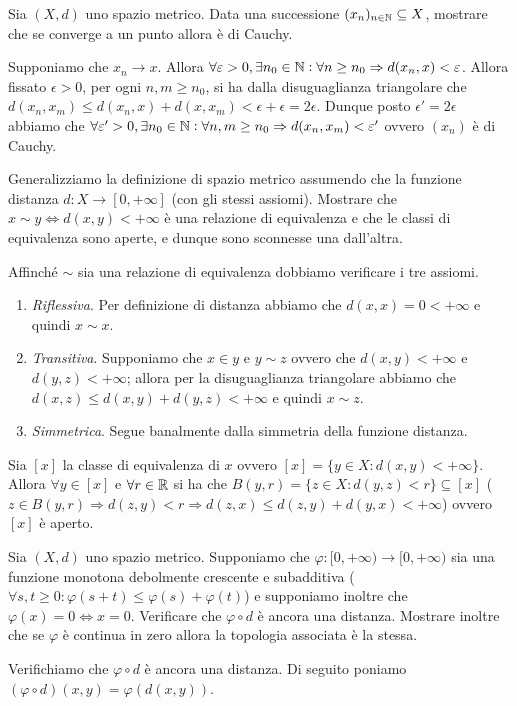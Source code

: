 \documentclass[a4paper]{article}\par \usepackage{style}\par
\begin{document}
\begin{es}
  Sia $ (X, d) $ uno spazio metrico. Data una successione $ (x_n)_{n \in \mathbb{N}} \subseteq X $, mostrare che se converge a un punto allora è di Cauchy.
\end{es}\par Supponiamo che $ x_n \to x $. Allora $ \forall \varepsilon > 0, \exists n_0 \in \mathbb{N} : \forall n \geq n_0 \Rightarrow d(x_n, x) < \varepsilon $. Allora fissato $ \epsilon > 0 $, per ogni $ n, m \geq n_0 $, si ha dalla disuguaglianza triangolare che $ d(x_n, x_m) \leq d(x_n, x) + d(x, x_m) < \epsilon + \epsilon = 2\epsilon $. Dunque posto $ \epsilon' = 2\epsilon $ abbiamo che $ \forall \varepsilon' > 0, \exists n_0 \in \mathbb{N} : \forall n, m \geq n_0 \Rightarrow d(x_n, x_m) < \varepsilon' $ ovvero $ (x_n) $ è di Cauchy.\par \begin{es}
  Generalizziamo la definizione di spazio metrico assumendo che la funzione distanza $ d \colon X \to [0, +\infty] $ (con gli stessi assiomi). Mostrare che $ x \sim y \iff d(x, y) < +\infty $ è una relazione di equivalenza e che le classi di equivalenza sono aperte, e dunque sono sconnesse una dall'altra.
\end{es}\par Affinché $ \sim $ sia una relazione di equivalenza dobbiamo verificare i tre assiomi.
\begin{enumerate}[label = (\roman*)]
\item \emph{Riflessiva}. Per definizione di distanza abbiamo che $ d(x, x) = 0 < +\infty $ e quindi $ x \sim x $.
\item \emph{Transitiva}. Supponiamo che $ x \in y $ e $ y \sim z $ ovvero che $ d(x, y) < +\infty $ e $ d(y, z) < +\infty $; allora per la disuguaglianza triangolare abbiamo che $ d(x, z) \leq d(x, y) + d(y, z) < +\infty $ e quindi $ x \sim z $.
\item \emph{Simmetrica}. Segue banalmente dalla simmetria della funzione distanza.
\end{enumerate}
Sia $ [x] $ la classe di equivalenza di $ x $ ovvero $ [x] = \{y \in X : d(x, y) < +\infty\} $. Allora $ \forall y \in [x] $ e $ \forall r \in \mathbb{R} $ si ha che $ B(y, r) = \{z \in X : d(y, z) < r\} \subseteq [x] $ ($ z \in B(y, r) \Rightarrow d(z, y) < r \Rightarrow d(z, x) \leq d(z, y) + d(y, x) < +\infty $) ovvero $ [x] $ è aperto.\par \begin{es}
  Sia $ (X, d) $ uno spazio metrico. Supponiamo che $ \varphi \colon [0, +\infty) \to [0, +\infty) $ sia una funzione monotona debolmente crescente e subadditiva ($ \forall s, t \geq 0 : \varphi(s + t) \leq \varphi(s) + \varphi(t) $) e supponiamo inoltre che $ \varphi(x) = 0 \iff x = 0 $. Verificare che $ \varphi \circ d $ è ancora una distanza. Mostrare inoltre che se $ \varphi $ è continua in zero allora la topologia associata è la stessa.
\end{es}\par Verifichiamo che $ \varphi \circ d $ è ancora una distanza. Di seguito poniamo $ (\varphi \circ d)(x, y) = \varphi\left(d(x, y)\right) $.
\end{document}

